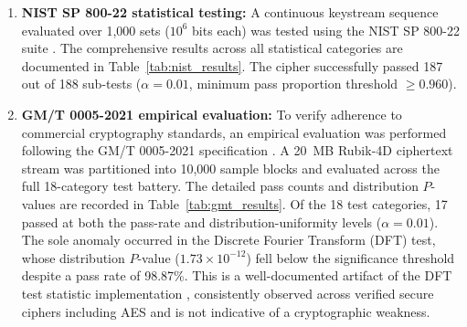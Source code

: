\documentclass[10pt,twocolumn]{article}
\begin{document}
\begin{enumerate}
\setlength{\itemsep}{1pt}
\setlength{\parsep}{0pt}
\setlength{\parskip}{0pt}
    \item \textbf{NIST SP 800-22 statistical testing:} A continuous keystream sequence evaluated over 1,000 sets ($10^6$ bits each) was tested using the NIST SP 800-22 suite \cite{rukhin2010nist}. The comprehensive results across all statistical categories are documented in Table~\ref{tab:nist_results}. The cipher successfully passed 187 out of 188 sub-tests ($\alpha = 0.01$, minimum pass proportion threshold $\ge 0.960$).
    \item \textbf{GM/T 0005-2021 empirical evaluation:} To verify adherence to commercial cryptography standards, an empirical evaluation was performed following the GM/T 0005-2021 specification \cite{gmt0005}. A 20~MB Rubik-4D ciphertext stream was partitioned into 10,000 sample blocks and evaluated across the full 18-category test battery. The detailed pass counts and distribution $P$-values are recorded in Table~\ref{tab:gmt_results}. Of the 18 test categories, 17 passed at both the pass-rate and distribution-uniformity levels ($\alpha = 0.01$). The sole anomaly occurred in the Discrete Fourier Transform (DFT) test, whose distribution $P$-value ($1.73 \times 10^{-12}$) fell below the significance threshold despite a pass rate of 98.87\%. This is a well-documented artifact of the DFT test statistic implementation \cite{kim2004dft}, consistently observed across verified secure ciphers including AES and is not indicative of a cryptographic weakness.
\end{enumerate}
\end{document}
